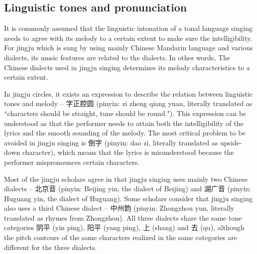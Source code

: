 \subsection{Linguistic tones and pronunciation}\label{sec:linguistic_tones}

It is commonly assumed that the linguistic intonation of a tonal language singing needs to agree with its melody to a certain extent to make sure the intelligibility. For jingju which is sung by using mainly Chinese Mandarin language and various dialects, its music features are related to the dialects. In other words, The Chinese dialects used in jingju singing determines its melody characteristics to a certain extent.

In jingju circles, it exists an expression to describe the relation between linguistic tones and melody -- 字正腔圆 (pinyin: zi zheng qiang yuan, literally translated as ``characters should be straight, tune should be round."). This expression can be understood as that the performer needs to attain both the intelligibility of the lyrics and the smooth sounding of the melody. The most critical problem to be avoided in jingju singing is 倒字 (pinyin: dao zi, literally translated as upside-down character), which means that the lyrics is misunderstood because the performer mispronounces certain characters.

Most of the jingju scholars agree in that jingju singing uses mainly two Chinese dialects -- 北京音 (pinyin: Beijing yin, the dialect of Beijing) and 湖广音 (pinyin: Huguang yin, the dialect of Huguang). Some scholars consider that jingju singing also uses a third Chinese dialect -- 中州韵 (pinyin: Zhongzhou yun, literally translated as rhymes from Zhongzhou). All three dialects share the same tone categories 阴平 (yin ping), 阳平 (yang ping), 上 (shang) and 去 (qu), although the pitch contours of the same characters realized in the same categories are different for the three dialects.

